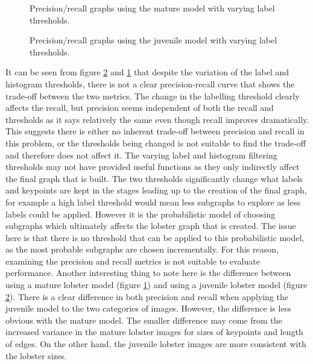 \begin{figure}[H]
\centering
{}
\caption{Precision/recall graphs using the mature model with varying label thresholds.}
\label{fig:pridentmat}
\end{figure}

\begin{figure}[H]
\centering
{}
\caption{Precision/recall graphs using the juvenile model with varying label thresholds.}
\label{fig:pridentjuv}
\end{figure}
\noindent
It can be seen from figure \ref{fig:pridentjuv} and \ref{fig:pridentmat} that despite the variation of the label and histogram thresholds, there is not a clear precision-recall curve that shows the trade-off between the two metrics. The change in the labelling threshold clearly affects the recall, but precision seems independent of both the recall and thresholds as it says relatively the same even though recall improves dramatically. This suggests there is either no inherent trade-off between precision and recall in this problem, or the thresholds being changed is not suitable to find the trade-off and therefore does not affect it. 
\n
The varying label and histogram filtering thresholds may not have provided useful functions as they only indirectly affect the final graph that is built. The two thresholds significantly change what labels and keypoints are kept in the stages leading up to the creation of the final graph, for example a high label threshold would mean less subgraphs to explore as less labels could be applied. However it is the probabilistic model of choosing subgraphs which ultimately affects the lobster graph that is created. The issue here is that there is no threshold that can be applied to this probabilistic model, as the most probable subgraphs are chosen incrementally. For this reason, examining the precision and recall metrics is not suitable to evaluate performance. 
\n
Another interesting thing to note here is the difference between using a mature lobster model (figure \ref{fig:pridentmat}) and using a juvenile lobster model (figure \ref{fig:pridentjuv}). There is a clear difference in both precision and recall when applying the juvenile model to the two categories of images. However, the difference is less obvious with the mature model. The smaller difference may come from the increased variance in the mature lobster images for sizes of keypoints and length of edges. On the other hand, the juvenile lobster images are more consistent with the lobster sizes. 

